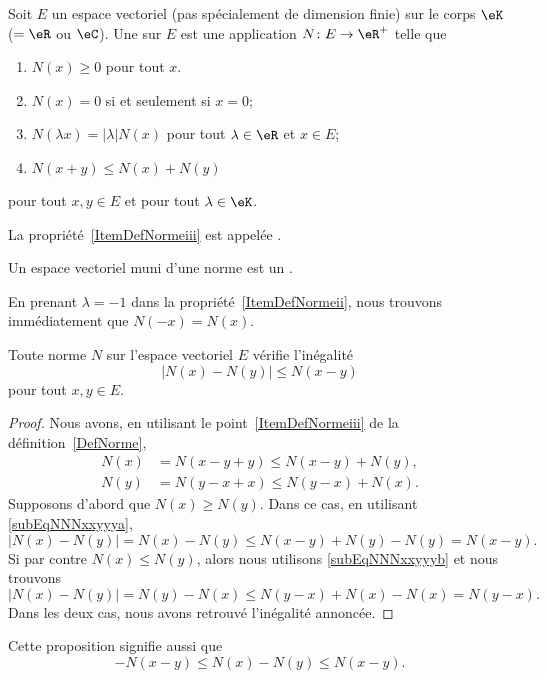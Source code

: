 \begin{definition}  \label{DefNorme}
    Soit \( E\) un espace vectoriel (pas spécialement de dimension finie) sur le corps \( \eK\) (\( =\eR\) ou \( \eC\)). Une   sur $E$ est une application $N\colon E\to \eR^+$ telle que
	\begin{enumerate}
        \item
            \( N(x)\geq 0\) pour tout \( x\).
		\item
            \( N(x)=0\) si et seulement si \( x=0\);
		\item\label{ItemDefNormeii}
			$N(\lambda x)=| \lambda |N(x)$ pour tout $\lambda\in\eR$ et $x\in E$;
		\item\label{ItemDefNormeiii}
			$N(x+y)\leq N(x)+N(y)$
	\end{enumerate}
    pour tout $x,y\in E$ et pour tout $\lambda\in\eK$.

    La propriété~\ref{ItemDefNormeiii} est appelée .

    Un espace vectoriel muni d'une norme est un .
\end{definition}
En prenant $\lambda=-1$ dans la propriété~\ref{ItemDefNormeii}, nous trouvons immédiatement que $N(-x)=N(x)$.

\begin{proposition}		\label{PropNmNNm}
	Toute norme $N$ sur l'espace vectoriel $E$ vérifie l'inégalité
	\begin{equation}
		\big| N(x)-N(y) \big|\leq N(x-y)
	\end{equation}
	pour tout $x,y\in E$.
\end{proposition}

\begin{proof}
	Nous avons, en utilisant le point~\ref{ItemDefNormeiii} de la définition~\ref{DefNorme},
	\begin{subequations}
		\begin{align}
			N(x)&=N(x-y+y)\leq N(x-y)+N(y),	\label{subEqNNNxxyyya}\\
			N(y)&=N(y-x+x)\leq N(y-x)+N(x).	\label{subEqNNNxxyyyb}
		\end{align}
	\end{subequations}
	Supposons d'abord que $N(x)\geq N(y)$. Dans ce cas, en utilisant \eqref{subEqNNNxxyyya},
	\begin{equation}
		\big| N(x)-N(y) \big|=N(x)-N(y)\leq N(x-y)+N(y)-N(y)=N(x-y).
	\end{equation}
	Si par contre $N(x)\leq N(y)$, alors nous utilisons \eqref{subEqNNNxxyyyb} et nous trouvons
	\begin{equation}
		\big| N(x)-N(y) \big|=N(y)-N(x)\leq N(y-x)+N(x)-N(x)=N(y-x).
	\end{equation}
	Dans les deux cas, nous avons retrouvé l'inégalité annoncée.
\end{proof}
Cette proposition signifie aussi que
\begin{equation}	\label{EqNleqNNleqNvqlqbs}
	-N(x-y)\leq N(x)-N(y)\leq N(x-y).
\end{equation}

